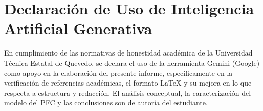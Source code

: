 \documentclass[12pt, a4paper]{article}
\begin{document}
\section*{Declaración de Uso de Inteligencia Artificial Generativa}
En cumplimiento de las normativas de honestidad académica de la Universidad Técnica Estatal de Quevedo, se declara el uso de la herramienta Gemini (Google) como apoyo en la elaboración del presente informe, específicamente en la verificación de referencias académicas, el formato LaTeX y su mejora en lo que respecta a estructura y redacción. El análisis conceptual, la caracterización del modelo del PFC y las conclusiones son de autoría del estudiante.
\end{document}

